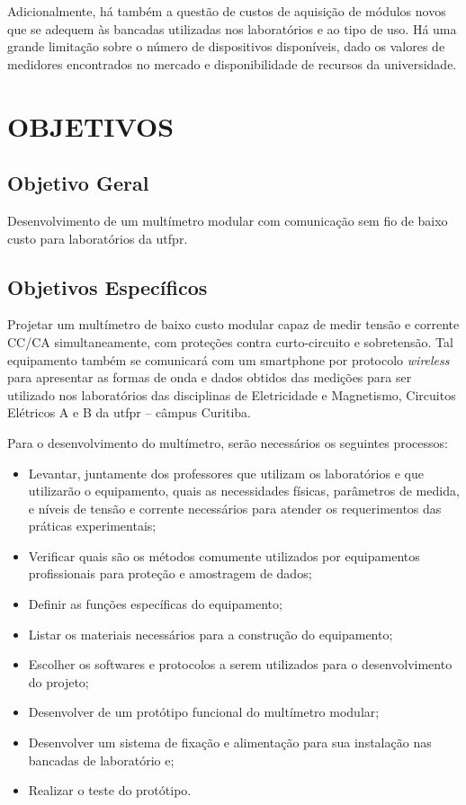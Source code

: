 Adicionalmente, há também a questão de custos de aquisição de módulos novos que se adequem às bancadas utilizadas nos laboratórios e ao tipo de uso. Há uma grande limitação sobre o número de dispositivos disponíveis, dado os valores de medidores encontrados no mercado e disponibilidade de recursos da universidade.

\section{OBJETIVOS}\label{sec:objetivos}

\subsection{Objetivo Geral}\label{sec:objgeral}
Desenvolvimento de um multímetro modular com comunicação sem fio de baixo custo para laboratórios da \gls{utfpr}.


\subsection{Objetivos Específicos}\label{sec:objespec}
Projetar um multímetro de baixo custo modular capaz de medir tensão e corrente \gls{CC}/\gls{CA} simultaneamente, com proteções contra curto-circuito e sobretensão. Tal equipamento também se comunicará com um smartphone por protocolo \textit{wireless} para apresentar as formas de onda e dados obtidos das medições para ser utilizado nos laboratórios das disciplinas de Eletricidade e Magnetismo, Circuitos Elétricos A e B da \gls{utfpr} – câmpus Curitiba.

Para o desenvolvimento do multímetro, serão necessários os seguintes processos:

\begin{itemize}
    \item Levantar, juntamente dos professores que utilizam os laboratórios e que utilizarão o equipamento, quais as necessidades físicas, parâmetros de medida, e níveis de tensão e corrente necessários para atender os requerimentos das práticas experimentais;
    \item Verificar quais são os métodos comumente utilizados por equipamentos profissionais para proteção e amostragem de dados;
    \item Definir as funções específicas do equipamento;
    \item Listar os materiais necessários para a construção do equipamento;
    \item Escolher os softwares e protocolos a serem utilizados para o desenvolvimento do projeto;
    \item Desenvolver de um protótipo funcional do multímetro modular;
    \item Desenvolver um sistema de fixação e alimentação para sua instalação nas bancadas de laboratório e;
    \item Realizar o teste do protótipo.
\end{itemize}

